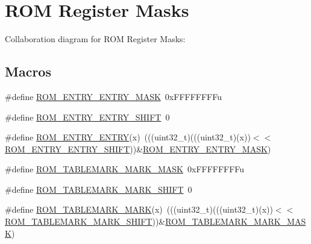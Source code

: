 \hypertarget{group___r_o_m___register___masks}{}\section{R\+OM Register Masks}
\label{group___r_o_m___register___masks}
Collaboration diagram for R\+OM Register Masks\+:
\subsection*{Macros}
\begin{DoxyCompactItemize}
\item 
\#define \hyperlink{group___r_o_m___register___masks_ga1857448185c74895d4ba462f8ebd76a9}{R\+O\+M\+\_\+\+E\+N\+T\+R\+Y\+\_\+\+E\+N\+T\+R\+Y\+\_\+\+M\+A\+SK}~0x\+F\+F\+F\+F\+F\+F\+F\+Fu
\item 
\#define \hyperlink{group___r_o_m___register___masks_gaef045dcd4648ca2c223f191d1e013673}{R\+O\+M\+\_\+\+E\+N\+T\+R\+Y\+\_\+\+E\+N\+T\+R\+Y\+\_\+\+S\+H\+I\+FT}~0
\item 
\#define \hyperlink{group___r_o_m___register___masks_gaffee58a0a8c0c3f652a6f88007194dc8}{R\+O\+M\+\_\+\+E\+N\+T\+R\+Y\+\_\+\+E\+N\+T\+RY}(x)~(((uint32\+\_\+t)(((uint32\+\_\+t)(x))$<$$<$\hyperlink{group___r_o_m___register___masks_gaef045dcd4648ca2c223f191d1e013673}{R\+O\+M\+\_\+\+E\+N\+T\+R\+Y\+\_\+\+E\+N\+T\+R\+Y\+\_\+\+S\+H\+I\+FT}))\&\hyperlink{group___r_o_m___register___masks_ga1857448185c74895d4ba462f8ebd76a9}{R\+O\+M\+\_\+\+E\+N\+T\+R\+Y\+\_\+\+E\+N\+T\+R\+Y\+\_\+\+M\+A\+SK})
\item 
\#define \hyperlink{group___r_o_m___register___masks_gaac600c2f3e33e425e374ca4f843d63e6}{R\+O\+M\+\_\+\+T\+A\+B\+L\+E\+M\+A\+R\+K\+\_\+\+M\+A\+R\+K\+\_\+\+M\+A\+SK}~0x\+F\+F\+F\+F\+F\+F\+F\+Fu
\item 
\#define \hyperlink{group___r_o_m___register___masks_gaffb544cfa94716cfd71a99bb45c7411a}{R\+O\+M\+\_\+\+T\+A\+B\+L\+E\+M\+A\+R\+K\+\_\+\+M\+A\+R\+K\+\_\+\+S\+H\+I\+FT}~0
\item 
\#define \hyperlink{group___r_o_m___register___masks_ga38bfb1952b2f112abc1e01ce0d2d24b1}{R\+O\+M\+\_\+\+T\+A\+B\+L\+E\+M\+A\+R\+K\+\_\+\+M\+A\+RK}(x)~(((uint32\+\_\+t)(((uint32\+\_\+t)(x))$<$$<$\hyperlink{group___r_o_m___register___masks_gaffb544cfa94716cfd71a99bb45c7411a}{R\+O\+M\+\_\+\+T\+A\+B\+L\+E\+M\+A\+R\+K\+\_\+\+M\+A\+R\+K\+\_\+\+S\+H\+I\+FT}))\&\hyperlink{group___r_o_m___register___masks_gaac600c2f3e33e425e374ca4f843d63e6}{R\+O\+M\+\_\+\+T\+A\+B\+L\+E\+M\+A\+R\+K\+\_\+\+M\+A\+R\+K\+\_\+\+M\+A\+SK})

\end{DoxyCompactItemize}
